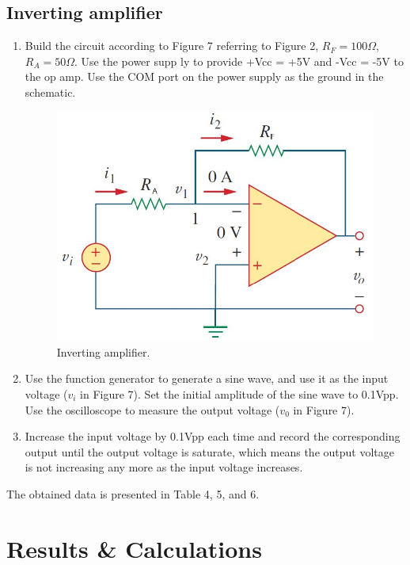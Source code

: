 \documentclass[a4paper]{report}
\begin{document}
	\subsection{Inverting amplifier}
	\begin{enumerate}[1.]
		\item Build the circuit according to Figure 7 referring to Figure 2, $R_F=100\Omega$, $R_A=50\Omega$. Use the power supp ly to provide +Vcc = +5V and -Vcc = -5V to the op amp. Use the COM port on the power supply as the ground in the schematic.
		\begin{figure}[H]
			\centering
			\includegraphics[width=1\linewidth]{7.jpg}
			\caption{Inverting amplifier.}
		\end{figure}
		\item Use the function generator to generate a sine wave, and use it as the input voltage ($v_i$ in Figure 7). Set the initial amplitude of the sine wave to 0.1Vpp. Use the oscilloscope to measure the output voltage ($v_0$ in Figure 7).
		\item Increase the input voltage by 0.1Vpp each time and record the corresponding output until the output voltage is saturate, which means the output voltage is not increasing any more as the input voltage increases.
	\end{enumerate}
	The obtained data is presented in Table 4, 5, and 6.
	\section{Results \& Calculations}
\end{document}
